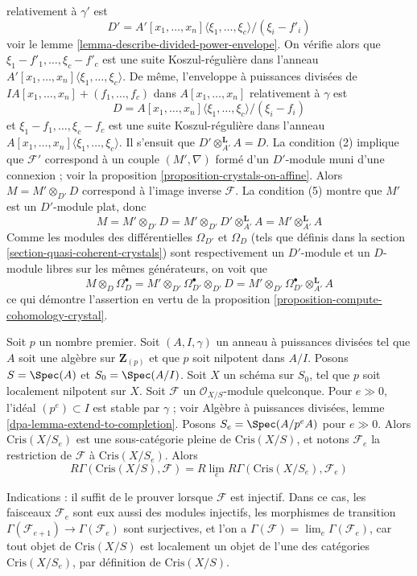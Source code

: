 \begin{remark}
relativement à $\gamma'$ est
$$
D' = A'[x_1, \ldots, x_n]\langle \xi_1, \ldots, \xi_c \rangle/(\xi_i - f'_i)
$$
voir le lemme \ref{lemma-describe-divided-power-envelope}. On vérifie alors que
$\xi_1 - f'_1, \ldots, \xi_c - f'_c$ est une suite Koszul-régulière dans
l'anneau $A'[x_1, \ldots, x_n]\langle \xi_1, \ldots, \xi_c\rangle$.
De même, l'enveloppe à puissances divisées de
$IA[x_1, \ldots, x_n] + (f_1, \ldots, f_c)$ dans $A[x_1, \ldots, x_n]$
relativement à $\gamma$ est
$$
D = A[x_1, \ldots, x_n]\langle \xi_1, \ldots, \xi_c\rangle/(\xi_i - f_i)
$$
et $\xi_1 - f_1, \ldots, \xi_c - f_c$ est une suite Koszul-régulière dans
l'anneau $A[x_1, \ldots, x_n]\langle \xi_1, \ldots, \xi_c\rangle$.
Il s'ensuit que $D' \otimes_{A'}^\mathbf{L} A = D$. La condition (2)
implique que $\mathcal{F}'$ correspond à un couple $(M', \nabla)$
formé d'un $D'$-module muni d'une connexion ; voir la
proposition \ref{proposition-crystals-on-affine}.
Alors $M = M' \otimes_{D'} D$ correspond à l'image inverse $\mathcal{F}$.
La condition (5) montre que $M'$ est un $D'$-module plat, donc
$$
M = M' \otimes_{D'} D = M' \otimes_{D'} D' \otimes_{A'}^\mathbf{L} A
= M' \otimes_{A'}^\mathbf{L} A
$$
Comme les modules des différentielles $\Omega_{D'}$ et $\Omega_D$
(tels que définis dans la section \ref{section-quasi-coherent-crystals})
sont respectivement un $D'$-module et un $D$-module libres sur les mêmes générateurs, on voit que
$$
M \otimes_D \Omega^\bullet_D =
M' \otimes_{D'} \Omega^\bullet_{D'} \otimes_{D'} D =
M' \otimes_{D'} \Omega^\bullet_{D'} \otimes_{A'}^\mathbf{L} A
$$
ce qui démontre l'assertion en vertu de la
proposition \ref{proposition-compute-cohomology-crystal}.
\end{remark}

\begin{remark}[Rlim]
\label{remark-rlim}
Soit $p$ un nombre premier. Soit $(A, I, \gamma)$ un anneau à puissances
divisées tel que $A$ soit une algèbre sur $\mathbf{Z}_{(p)}$ et que $p$ soit nilpotent
dans $A/I$. Posons $S = \Spec(A)$ et $S_0 = \Spec(A/I)$.
Soit $X$ un schéma sur $S_0$, tel que $p$ soit localement
nilpotent sur $X$. Soit $\mathcal{F}$ un
$\mathcal{O}_{X/S}$-module quelconque. Pour $e \gg 0$, l'idéal $(p^e) \subset I$
est stable par $\gamma$ ; voir
Algèbre à puissances divisées, lemme \ref{dpa-lemma-extend-to-completion}.
Posons $S_e = \Spec(A/p^eA)$ pour $e \gg 0$.
Alors $\text{Cris}(X/S_e)$ est une sous-catégorie pleine de $\text{Cris}(X/S)$,
et notons $\mathcal{F}_e$ la restriction de $\mathcal{F}$ à
$\text{Cris}(X/S_e)$. Alors
$$
R\Gamma(\text{Cris}(X/S), \mathcal{F}) =
R\lim_e R\Gamma(\text{Cris}(X/S_e), \mathcal{F}_e)
$$

\medskip\noindent
Indications : il suffit de le prouver lorsque $\mathcal{F}$ est injectif.
Dans ce cas, les faisceaux $\mathcal{F}_e$ sont eux aussi des
modules injectifs, les morphismes de transition
$\Gamma(\mathcal{F}_{e + 1}) \to \Gamma(\mathcal{F}_e)$ sont
surjectives, et l'on a
$\Gamma(\mathcal{F}) = \lim_e \Gamma(\mathcal{F}_e)$, car
tout objet de $\text{Cris}(X/S)$ est localement un objet de l'une
des catégories $\text{Cris}(X/S_e)$, par définition de
$\text{Cris}(X/S)$.
\end{remark}

